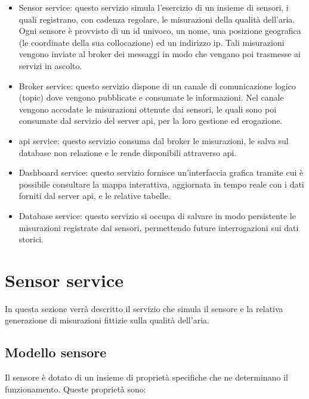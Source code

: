 \begin{itemize}
  \item Sensor service: questo servizio simula l'esercizio di un insieme di sensori, i quali registrano,
        con cadenza regolare, le misurazioni della qualità dell'aria. Ogni sensore è provvisto di un id univoco,
        un nome, una posizione geografica (le coordinate della sua collocazione) ed un indirizzo \acrshort{ip}.
        Tali misurazioni vengono inviate al broker dei messaggi in modo che vengano poi trasmesse ai servizi in ascolto.
  \item Broker service: questo servizio dispone di un canale di comunicazione logico (topic)
        dove vengono pubblicate e consumate le informazioni. Nel canale vengono accodate le misurazioni
        ottenute dai sensori, le quali sono poi consumate dal servizio del server \acrshort{api},
        per la loro gestione ed erogazione.
  \item \acrshort{api} service: questo servizio consuma dal broker le misurazioni, le salva
        sul database non relazione e le rende disponibili attraverso \acrshort{api}.
  \item Dashboard service: questo servizio fornisce un'interfaccia grafica tramite cui è possibile consultare
        la mappa interattiva, aggiornata in tempo reale con i dati forniti dal server \acrshort{api}, e le relative
        tabelle.
  \item Database service: questo servizio si occupa di salvare in modo persistente le misurazioni
        registrate dai sensori, permettendo future interrogazioni sui dati storici.
\end{itemize}

\section{Sensor service}

In questa sezione verrà descritto il servizio che simula il sensore e la relativa generazione di misurazioni fittizie
sulla qualità dell'aria.

\subsection{Modello sensore}

Il sensore è dotato di un insieme di proprietà specifiche che ne determinano il funzionamento.
Queste proprietà sono:

